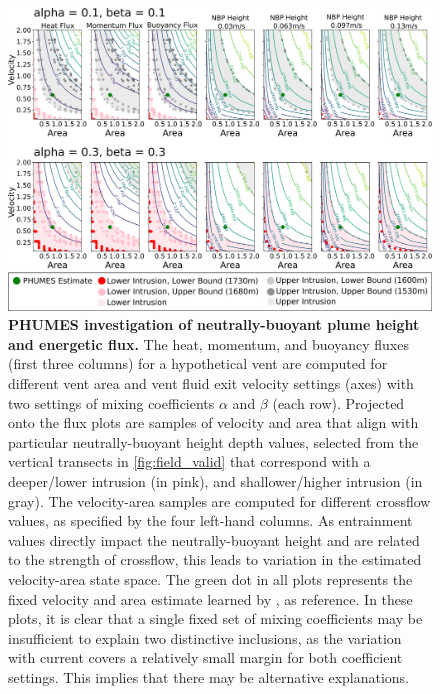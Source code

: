 \begin{figure}
    \centering
    \includegraphics[width=1\columnwidth]{figures/flux_nbp.png}
    \caption[\PHUMES investigation of neutrally-buoyant plume height and energetic flux.]{\textbf{PHUMES investigation of neutrally-buoyant plume height and energetic flux.} The heat, momentum, and buoyancy fluxes (first three columns) for a hypothetical vent are computed for different vent area and vent fluid exit velocity settings (axes) with two settings of mixing coefficients $\alpha$ and $\beta$ (each row). Projected onto the flux plots are samples of velocity and area that align with particular neutrally-buoyant height depth values, selected from the vertical transects in \cref{fig:field_valid} that correspond with a deeper/lower intrusion (in pink), and shallower/higher intrusion (in gray). The velocity-area samples are computed for different crossflow values, as specified by the four left-hand columns. As entrainment values directly impact the neutrally-buoyant height and are related to the strength of crossflow, this leads to variation in the estimated velocity-area state space. The green dot in all plots represents the fixed velocity and area estimate learned by \PHUMES, as reference. In these plots, it is clear that a single fixed set of mixing coefficients may be insufficient to explain two distinctive inclusions, as the variation with current covers a relatively small margin for both coefficient settings. This implies that there may be alternative explanations.}
    \label{fig:nbp_flux}
\end{figure}



